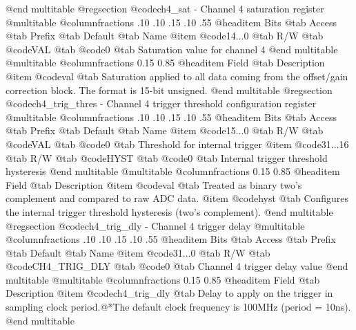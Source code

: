 @end multitable
@regsection @code{ch4_sat} - Channel 4 saturation register
@multitable @columnfractions .10 .10 .15 .10 .55
@headitem Bits @tab Access @tab Prefix @tab Default @tab Name
@item @code{14...0}
@tab R/W @tab
@code{VAL}
@tab @code{0} @tab 
Saturation value for channel 4
@end multitable
@multitable @columnfractions 0.15 0.85
@headitem Field @tab Description
@item @code{val} @tab Saturation applied to all data coming from the offset/gain correction block. The format is 15-bit unsigned.
@end multitable
@regsection @code{ch4_trig_thres} - Channel 4 trigger threshold configuration register
@multitable @columnfractions .10 .10 .15 .10 .55
@headitem Bits @tab Access @tab Prefix @tab Default @tab Name
@item @code{15...0}
@tab R/W @tab
@code{VAL}
@tab @code{0} @tab 
Threshold for internal trigger
@item @code{31...16}
@tab R/W @tab
@code{HYST}
@tab @code{0} @tab 
Internal trigger threshold hysteresis
@end multitable
@multitable @columnfractions 0.15 0.85
@headitem Field @tab Description
@item @code{val} @tab Treated as binary two's complement and compared to raw ADC data.
@item @code{hyst} @tab Configures the internal trigger threshold hysteresis (two's complement).
@end multitable
@regsection @code{ch4_trig_dly} - Channel 4 trigger delay
@multitable @columnfractions .10 .10 .15 .10 .55
@headitem Bits @tab Access @tab Prefix @tab Default @tab Name
@item @code{31...0}
@tab R/W @tab
@code{CH4_TRIG_DLY}
@tab @code{0} @tab 
Channel 4 trigger delay value
@end multitable
@multitable @columnfractions 0.15 0.85
@headitem Field @tab Description
@item @code{ch4_trig_dly} @tab Delay to apply on the trigger in sampling clock period.@*The default clock frequency is 100MHz (period = 10ns).
@end multitable
